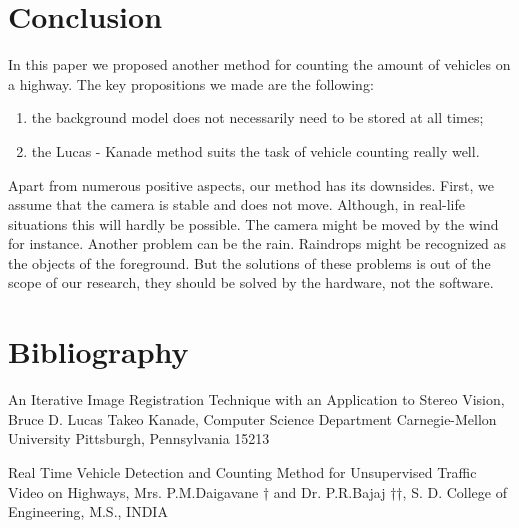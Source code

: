 \documentclass[12pt,a4paper,oneside,titlepage]{article}
\begin{document}
\section{Conclusion}


In this paper we proposed another method for counting the amount of vehicles on a highway.
The key propositions we made are the following:
\begin{enumerate}
	\item the background model does not necessarily need to be stored at all times;
	\item the Lucas - Kanade method \cite{lucaskanade} suits the task of vehicle counting really well. 
\end{enumerate}

Apart from numerous positive aspects, our method has its downsides.
First, we assume that the camera is stable and does not move.
Although, in real-life situations this will hardly be possible.
The camera might be moved by the wind for instance.
Another problem can be the rain.
Raindrops might be recognized as the objects of the foreground.
But the solutions of these problems is out of the scope of our research, they should be solved by the hardware, not the software.



\newpage
\section{Bibliography}
\begin{thebibliography}{99}
 An Iterative Image Registration Technique with an Application to Stereo Vision, Bruce D. Lucas Takeo Kanade, Computer Science Department Carnegie-Mellon University Pittsburgh, Pennsylvania 15213

 Real Time Vehicle Detection and Counting Method for Unsupervised Traffic Video on Highways, Mrs. P.M.Daigavane † and Dr. P.R.Bajaj ††, S. D. College of Engineering, M.S., INDIA
\end{thebibliography}
\end{document}
